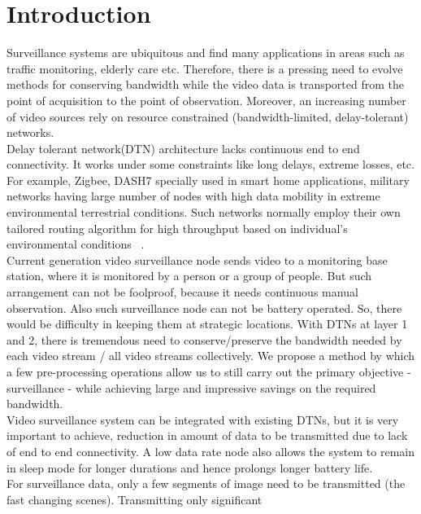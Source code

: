 
\chapter{Introduction} %
\label{Chapter1}

\indent Surveillance systems are ubiquitous and find many applications
in areas such as traffic monitoring, elderly care etc. Therefore, there
is a pressing need to evolve methods for conserving bandwidth while the
video data is transported from the point of acquisition to the point of
observation. Moreover, an increasing number of video sources rely on
resource constrained (bandwidth-limited, delay-tolerant) networks.\\
\indent Delay tolerant network(DTN) architecture lacks continuous end to
end connectivity. It works under some constraints like long delays,
extreme losses, etc. For example, Zigbee, DASH7 specially used in smart
home applications, military networks having large number of nodes with
high data mobility in extreme environmental terrestrial conditions. Such
networks normally employ their own tailored routing algorithm for high
throughput based on individual's environmental conditions ~\cite{1}.\\
\indent Current generation video surveillance node sends video to a
monitoring base station, where it is monitored by a person or a group of
people. But such arrangement can not be foolproof, because it needs
continuous manual observation.  Also such surveillance node can not be
battery operated.  So, there would be difficulty in keeping them at
strategic locations.  With DTNs at layer 1 and 2, there is tremendous
need to conserve/preserve the bandwidth needed by each video stream /
all video streams collectively. We propose a method by which a few
pre-processing operations allow us to still carry out the primary
objective - surveillance - while achieving large and impressive savings
on the required bandwidth.\\
\indent Video surveillance system can be integrated with existing DTNs,
but it is very important to achieve, reduction in amount of data to be
transmitted due to lack of end to end connectivity. A low data rate node
also allows the system to remain in sleep mode for longer durations and
hence prolongs longer battery life.\\
\indent For surveillance data, only a few segments of image need to be
transmitted (the fast changing scenes). Transmitting only significant
